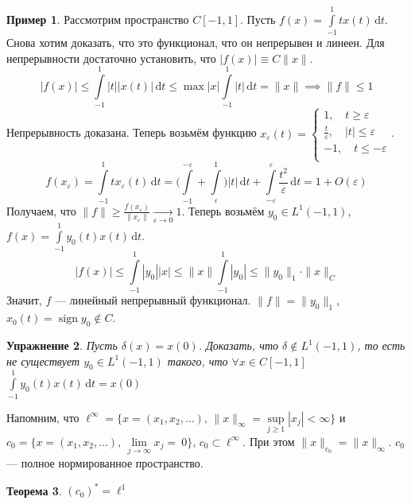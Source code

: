\documentclass[11pt,openany,a4paper]{scrartcl}
\theoremstyle{plain}
\newtheorem{theorem}{Теорема}[subsection]
\newtheorem{exercise}[theorem]{Упражнение}
\theoremstyle{definition}
\newtheorem{example}[theorem]{Пример}
\newcommand{\underto}[1]{\xrightarrow[#1]{}}
\newcommand{\dif}{\, \mathrm d}
\DeclareMathOperator{\sign}{sign}
\begin{document}
\begin{example}
    Рассмотрим пространство $C[-1, 1]$. Пусть $f(x) = \int\limits_{-1}^1
    tx(t)\dif t$. Снова хотим доказать, что это функционал, что он непрерывен и 
    линеен.
    Для непрерывности достаточно установить, что $|f(x)| \equiv C\|x\|$.
    $$
    |f(x)| \leqslant \int\limits_{-1}^1 |t||x(t)|\dif t \leqslant
    \max |x| \int\limits_{-1}^1 |t|\dif t = \|x\| \implies \|f\| \leqslant 1
    $$
    Непрерывность доказана.
    Теперь возьмём функцию $x_\varepsilon(t) =
    \begin{cases}
        1,\quad t \geqslant \varepsilon \\
        \frac{t}{\varepsilon},\quad |t|\leqslant \varepsilon \\
        -1,\quad t \leqslant -\varepsilon\\
    \end{cases}$.
    $$
    f(x_\varepsilon) = \int\limits_{-1}^1 tx_\varepsilon(t)\dif t =
    \bigg(\int\limits_{-1}^{-\varepsilon} + \int\limits_\varepsilon^1\bigg)
    |t|\dif t + \int\limits_{-\varepsilon}^\varepsilon \frac{t^2}{\varepsilon}
    \dif t = 1 + O(\varepsilon)
    $$
    Получаем, что $\|f\|\geqslant \frac{f(x_\varepsilon)}{\|x_\varepsilon\|}
    \underto{\varepsilon \to 0} 1$.
    Теперь возьмём
    $y_0 \in L^1(-1, 1)$, $f(x) = \int\limits_{-1}^1 y_0(t)x(t)\dif t$.
    $$
    |f(x)| \leqslant \int\limits_{-1}^1 |y_0||x| \leqslant \|x\|\int\limits_{-1}^1
    |y_0| \leqslant \|y_0\|_1\cdot \|x\|_C
    $$
    Значит, $f$ — линейный непрерывный функционал. $\|f\|=\|y_0\|_1$,
    $x_0(t) = \sign y_0 \notin C$.
\end{example}
\begin{exercise}
    Пусть $\delta(x) = x(0)$. Доказать, что $\delta \notin L^1(-1, 1)$, то есть
    не существует $y_0 \in L^1(-1, 1)$ такого, что $\forall x\in C[-1, 1]$
    $\int\limits_{-1}^1 y_0(t)x(t)\dif t = x(0)$
\end{exercise}

Напомним, что $\ell^\infty = \{x = (x_1, x_2, \ldots),\, \|x\|_\infty = 
\sup\limits_{j \geqslant 1} |x_j| < \infty\}$ и
$c_0 = \{x = (x_1, x_2, \ldots),\, \lim\limits_{j \to \infty} x_j =~0\}$,
$c_0 \subset \ell^\infty$. При этом $\|x\|_{c_0} = \|x\|_\infty$. $c_0$ — полное
нормированное пространство.

\begin{theorem}
    $(c_0)^\ast = \ell^1$
\end{theorem}
\end{document}
